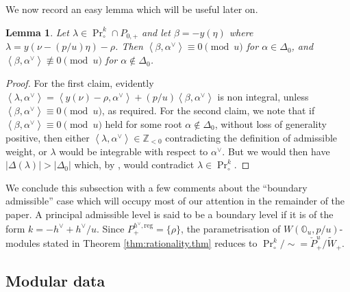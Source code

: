 \documentclass[12pt]{amsart}
\theoremstyle{plain}
\newtheorem{lemma}[thm]{Lemma}
\theoremstyle{definition}
\numberwithin{equation}{section}
\newcommand{\al}{\alpha}
\newcommand{\la}{\lambda}
\newcommand{\D}{\Delta}
\newcommand{\Z}{\mathbb{Z}}
\newcommand{\wtil}[1]{\widetilde#1}
\newcommand{\mbo}{\mathbb{O}}
\DeclareMathOperator{\prin}{Pr}
\begin{document}
We now record an easy lemma which will be useful later on.
\begin{lemma}\label{lem:replete.integrability.general}
Let $\la \in \prin^k_\circ \cap P_{0, +}$ and let $\beta = -y(\eta)$ where $\la = y(\nu - (p/u)\eta) -\rho$. Then $\left<\beta, \al^\vee \right> \equiv 0 \pmod{u}$ for $\al \in \D_0$, and $\left<\beta, \al^\vee \right> \not\equiv 0 \pmod{u}$ for $\al \notin \D_0$.
\end{lemma}

\begin{proof}
For the first claim, evidently $\left<\la, \al^\vee\right> = \left<y(\nu)-\rho, \al^\vee\right> + (p/u)\left<\beta, \al^\vee\right>$ is non integral, unless $\left<\beta, \al^\vee \right> \equiv 0 \pmod{u}$, as required. For the second claim, we note that if $\left<\beta, \al^\vee \right> \equiv 0 \pmod{u}$ held for some root $\al \notin \D_0$, without loss of generality positive, then either $\left<\la, \al^\vee \right> \in \Z_{<0}$ contradicting the definition of admissible weight, or $\la$ would be integrable with respect to $\al^\vee$. But we would then have $|\D(\la)| > |\D_0|$ which, by {\cite[Theorem 3.6]{AE2023}}, would contradict $\la \in \prin_\circ^k$.
\end{proof}


We conclude this subsection with a few comments about the ``boundary admissible'' case which will occupy most of our attention in the remainder of the paper. A principal admissible level is said to be a boundary level if it is of the form $k = -h^\vee + h^\vee / u$. Since $P_+^{h^\vee, \text{reg}} = \{\rho\}$, the parametrisation of $W(\mbo_u, p/u)$-modules stated in Theorem \ref{thm:rationality.thm} reduces to $\prin^k_\circ / \sim = \check{P}_+^{u} / \wtil{W}_+$.




\subsection{Modular data}\label{subsec:mod.data}
\end{document}
